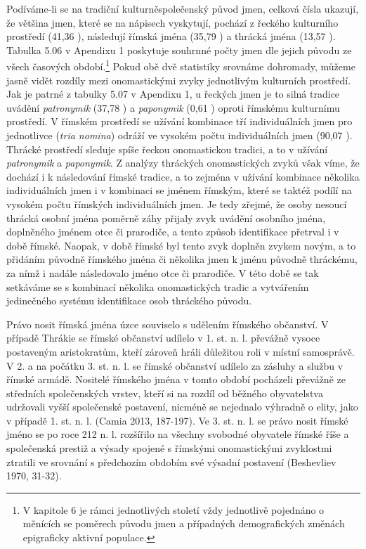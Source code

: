 Podíváme-li se na tradiční kulturněspolečenský původ jmen, celková čísla ukazují, že většina jmen, které se na nápisech vyskytují, pochází z řeckého kulturního prostředí (41,36 ), následují římská jména (35,79 ) a thrácká jména (13,57 ). Tabulka 5.06 v Apendixu 1 poskytuje souhrnné počty jmen dle jejich původu ze všech časových období.\footnote{V kapitole 6 je rámci jednotlivých století vždy jednotlivě pojednáno o měnících se poměrech původu jmen a případných demografických změnách epigraficky aktivní populace.} Pokud obě dvě statistiky srovnáme dohromady, můžeme jasně vidět rozdíly mezi onomastickými zvyky jednotlivým kulturních prostředí. Jak je patrné z tabulky 5.07 v Apendixu 1, u řeckých jmen je to silná tradice uvádění {\em patronymik} (37,78 ) a {\em paponymik} (0,61 ) oproti římskému kulturnímu prostředí. V římském prostředí se užívání kombinace tří individuálních jmen pro jednotlivce ({\em tria nomina}) odráží ve vysokém počtu individuálních jmen (90,07 ). Thrácké prostředí sleduje spíše řeckou onomastickou tradici, a to v užívání {\em patronymik} a {\em paponymik}. Z analýzy thráckých onomastických zvyků však víme, že dochází i k následování římské tradice, a to zejména v užívání kombinace několika individuálních jmen i v kombinaci se jménem římským, které se taktéž podílí na vysokém počtu římských individuálních jmen. Je tedy zřejmé, že osoby nesoucí thrácká osobní jména poměrně záhy přijaly zvyk uvádění osobního jména, doplněného jménem otce či prarodiče, a tento způsob identifikace přetrval i v době římské. Naopak, v době římské byl tento zvyk doplněn zvykem novým, a to přidáním původně římského jména či několika jmen k jménu původně thráckému, za nímž i nadále následovalo jméno otce či prarodiče. V této době se tak setkáváme se s kombinací několika onomastických tradic a vytvářením jedinečného systému identifikace osob thráckého původu.

Právo nosit římská jména úzce souviselo s udělením římského občanství. V případě Thrákie se římské občanství udílelo v 1. st. n. l. převážně vysoce postaveným aristokratům, kteří zároveň hráli důležitou roli v místní samosprávě. V 2. a na počátku 3. st. n. l. se římské občanství udílelo za zásluhy a službu v římské armádě. Nositelé římského jména v tomto období pocházeli převážně ze středních společenských vrstev, kteří si na rozdíl od běžného obyvatelstva udržovali vyšší společenské postavení, nicméně se nejednalo výhradně o elity, jako v případě 1. st. n. l. (Camia 2013, 187-197). Ve 3. st. n. l. se právo nosit římské jméno se po roce 212 n. l. rozšířilo na všechny svobodné obyvatele římské říše a společenská prestiž a výsady spojené s římskými onomastickými zvyklostmi ztratili ve srovnání s předchozím obdobím své výsadní postavení (Beshevliev 1970, 31-32).

